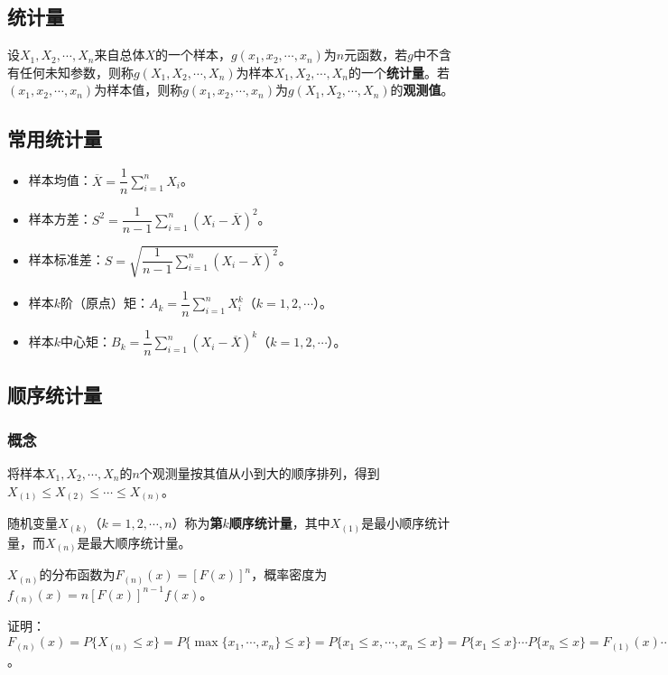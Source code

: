 \documentclass[UTF8, 12pt]{ctexart}
\begin{document}
\subsection{统计量}

设$X_1,X_2,\cdots,X_n$来自总体$X$的一个样本，$g(x_1,x_2,\cdots,x_n)$为$n$元函数，若$g$中不含有任何未知参数，则称$g(X_1,X_2,\cdots,X_n)$为样本$X_1,X_2,\cdots,X_n$的一个\textbf{统计量}。若$(x_1,x_2,\cdots,x_n)$为样本值，则称$g(x_1,x_2,\cdots,x_n)$为$g(X_1,X_2,\cdots,X_n)$的\textbf{观测值}。

\subsection{常用统计量}

\begin{itemize}
    \item 样本均值：$\overline{X}=\dfrac{1}{n}\sum\limits_{i=1}^nX_i$。
    \item 样本方差：$S^2=\dfrac{1}{n-1}\sum\limits_{i=1}^n(X_i-\overline{X})^2$。
    \item 样本标准差：$S=\sqrt{\dfrac{1}{n-1}\sum\limits_{i=1}^n(X_i-\overline{X})^2}$。
    \item 样本$k$阶（原点）矩：$A_k=\dfrac{1}{n}\sum\limits_{i=1}^nX_i^k$（$k=1,2,\cdots$）。
    \item 样本$k$中心矩：$B_k=\dfrac{1}{n}\sum\limits_{i=1}^n(X_i-\overline{X})^k$（$k=1,2,\cdots$）。
\end{itemize}

\subsection{顺序统计量}

\subsubsection{概念}

将样本$X_1,X_2,\cdots,X_n$的$n$个观测量按其值从小到大的顺序排列，得到$X_{(1)}\leqslant X_{(2)}\leqslant\cdots\leqslant X_{(n)}$。

随机变量$X_{(k)}$（$k=1,2,\cdots,n$）称为\textbf{第$k$顺序统计量}，其中$X_{(1)}$是最小顺序统计量，而$X_{(n)}$是最大顺序统计量。

$X_{(n)}$的分布函数为$F_{(n)}(x)=[F(x)]^n$，概率密度为$f_{(n)}(x)=n[F(x)]^{n-1}f(x)$。

证明：$F_{(n)}(x)=P\{X_{(n)}\leqslant x\}=P\{\max\{x_1,\cdots,x_n\}\leqslant x\}=P\{x_1\leqslant x,\cdots,x_n\leqslant x\}=P\{x_1\leqslant x\}\cdots P\{x_n\leqslant x\}=F_{(1)}(x)\cdots F_{(n)}(x)=[F(x)]^n$。
\end{document}

